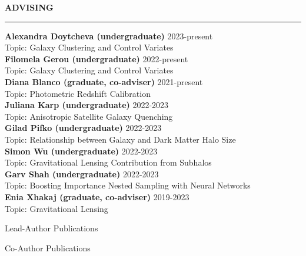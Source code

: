 \documentclass[12pt]{article}
\renewenvironment{section}[1]
  {
  \medskip
  {\color{yaleblue} \MakeUppercase{\bf #1}}
  \smallskip
  \hrule
  \medskip
  \begin{adjustwidth}{0.3cm}{}
  }
  {
  \end{adjustwidth}
  }
\newenvironment{ref-section}[1]
  {
  \medskip
  {\color{yaleblue} \MakeUppercase{\bf #1}}
  \smallskip
  \hrule
  \medskip
  \begin{refsection}
  }
  {
  \end{refsection}
  }
\newcommand{\entry}[3]{{\bf #1} \hfill {#2} \\ {#3}}
\begin{document}
\begin{section}{Advising}
  \entry{Alexandra Doytcheva (undergraduate)}{2023-present}{Topic: Galaxy Clustering and Control Variates} \medskip \\
  \entry{Filomela Gerou (undergraduate)}{2022-present}{Topic: Galaxy Clustering and Control Variates} \medskip \\
  \entry{Diana Blanco (graduate, co-adviser)}{2021-present}{Topic: Photometric Redshift Calibration} \medskip \\
  \entry{Juliana Karp (undergraduate)}{2022-2023}{Topic: Anisotropic Satellite Galaxy Quenching} \medskip \\
  \entry{Gilad Pifko (undergraduate)}{2022-2023}{Topic: Relationship between Galaxy and Dark Matter Halo Size} \medskip \\
  \entry{Simon Wu (undergraduate)}{2022-2023}{Topic: Gravitational Lensing Contribution from Subhalos} \medskip \\
  \entry{Garv Shah (undergraduate)}{2022-2023}{Topic: Boosting Importance Nested Sampling with Neural Networks} \medskip \\
  \entry{Enia Xhakaj (graduate, co-adviser)}{2019-2023}{Topic: Gravitational Lensing} \medskip \\
\end{section}

\begin{ref-section}{Lead-Author Publications}
  \nocite{Lange2023_MNRAS_525_3181, Karp2023_ApJ_949_13, Lange2023_MNRAS_520_5373, Lange2022_MNRAS_509_1779, Lange2021_MNRAS_502_2074, Lange2019_MNRAS_490_1870, Lange2019_MNRAS_488_5771, Lange2019_MNRAS_487_3112, Lange2019_MNRAS_482_4824, Lange2018_MNRAS_473_2830, Lange2016_ApJ_819_4, Lange2015_MNRAS_447_939, Lange2013_AA_551_89}
  \printbibliography[heading=none]
\end{ref-section}

\begin{ref-section}{Co-Author Publications}
  \nocite{Wang2023_arXiv_2312_7459, Hadzhiyska2023_MNRAS_525_4367, Ruggeri2023_MNRAS_525_3865, DESICollaboration2023_arXiv_2306_6308, DESICollaboration2023_arXiv_2306_6307, Xhakaj2023_arXiv_2306_3777, Wang2022_MNRAS_516_4003, DESICollaboration2022_AJ_164_207, Huang2022_MNRAS_515_4722, Xhakaj2022_MNRAS_514_2876, Dawson2022_arXiv_2203_7291, Leauthaud2022_MNRAS_510_6150, Wang2020_MNRAS_498_4450, vandenBosch2019_MNRAS_488_4984, Wang2019_MNRAS_488_3541, Zentner2019_MNRAS_485_1196, Campbell2018_MNRAS_477_359, Villarreal2017_MNRAS_472_1088, Nelson2016_ApJ_828_27, Momcheva2016_ApJS_225_27}
  \printbibliography[heading=none]
\end{ref-section}
\end{document}
